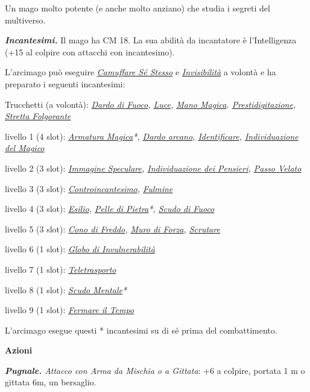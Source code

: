 \begin{multicols}{2}
{Un mago molto potente (e anche molto anziano) che studia i segreti del multiverso.

\emph{\textbf{Incantesimi.}} Il mago ha CM 18. La sua abilità da incantatore è l'Intelligenza (+15 al colpire con attacchi con incantesimo).

L'arcimago può eseguire \emph{\hyperlink{Camuffare Sé Stesso}{Camuffare Sé Stesso}} e \emph{\hyperlink{Invisibilità}{Invisibilità}} a volontà e ha preparato i seguenti incantesimi:

Trucchetti (a volontà): \emph{\hyperlink{Dardo di Fuoco}{Dardo di Fuoco}, \hyperlink{Luce}{Luce}, \hyperlink{Mano Magica}{Mano Magica}. \hyperlink{Prestidigitazione}{Prestidigitazione}, \hyperlink{Stretta Folgorante}{Stretta Folgorante}}

livello 1 (4 slot): \emph{\hyperlink{Armatura Magica}{Armatura Magica}*, \hyperlink{Dardo arcano}{Dardo arcano}, \hyperlink{Identificare}{Identificare}, \hyperlink{Individuazione del Magico}{Individuazione del Magico}}

livello 2 (3 slot): \emph{\hyperlink{Immagine Speculare}{Immagine Speculare}, \hyperlink{Individuazione dei Pensieri}{Individuazione dei Pensieri}, \hyperlink{Passo Velato}{Passo Velato}}

livello 3 (3 slot): \emph{\hyperlink{Controincantesimo}{Controincantesimo}, \hyperlink{Fulmine}{Fulmine}}

livello 4 (3 slot): \emph{\hyperlink{Esilio}{Esilio}, \hyperlink{Pelle di Pietra}{Pelle di Pietra}*, \hyperlink{Scudo di Fuoco}{Scudo di Fuoco}}

livello 5 (3 slot): \emph{\hyperlink{Cono di Freddo}{Cono di Freddo}, \hyperlink{Muro di Forza}{Muro di Forza}, \hyperlink{Scrutare}{Scrutare}}

livello 6 (1 slot): \emph{\hyperlink{Globo di Invulnerabilità}{Globo di Invulnerabilità}}

livello 7 (1 slot): \emph{\hyperlink{Teletrasporto}{Teletrasporto}}

livello 8 (1 slot): \emph{\hyperlink{Scudo Mentale}{Scudo Mentale}*}

livello 9 (1 slot): \emph{\hyperlink{Fermare il Tempo}{Fermare il Tempo}}

L'arcimago esegue questi * incantesimi su di sé prima del combattimento.

\textbf{Azioni}

\emph{\textbf{Pugnale.} Attacco con Arma da Mischia o a Gittata}: +6 a colpire, portata 1 m o gittata 6m, un bersaglio.

}
\end{multicols}

